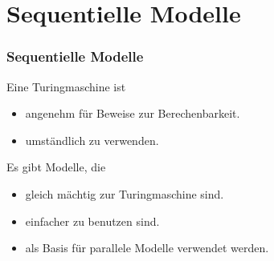 \section{Sequentielle Modelle}

\begin{frame}
    \frametitle{Sequentielle Modelle}
    Eine Turingmaschine ist
    \begin{itemize}
        \item angenehm für Beweise zur Berechenbarkeit.
        \item umständlich zu verwenden.
    \end{itemize}
    Es gibt Modelle, die
    \begin{itemize}
        \item gleich mächtig zur Turingmaschine sind.
        \item einfacher zu benutzen sind.
        \item als Basis für parallele Modelle verwendet werden.
    \end{itemize}
\end{frame}

